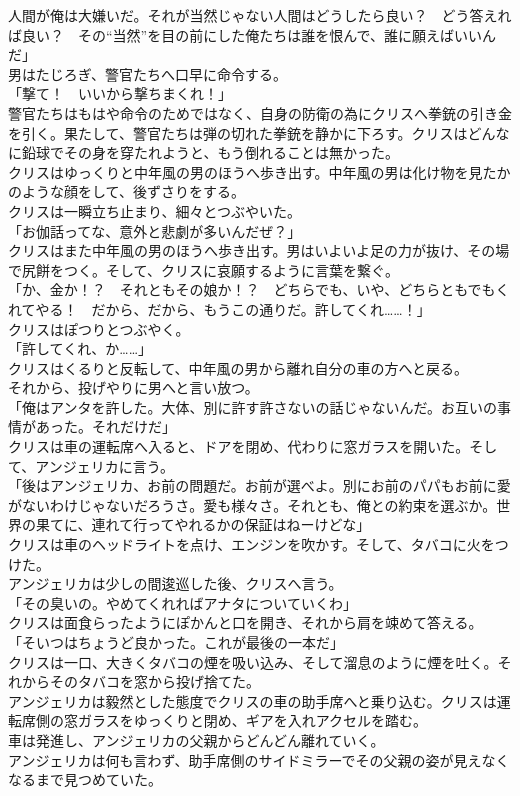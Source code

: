 \documentclass[b5j,10pt,openany]{jsbook}
\begin{document}
人間が俺は大嫌いだ。それが当然じゃない人間はどうしたら良い？　どう答えれば良い？　その``当然''を目の前にした俺たちは誰を恨んで、誰に願えばいいんだ」\\男はたじろぎ、警官たちへ口早に命令する。\\「撃て！　いいから撃ちまくれ！」\\警官たちはもはや命令のためではなく、自身の防衛の為にクリスへ拳銃の引き金を引く。果たして、警官たちは弾の切れた拳銃を静かに下ろす。クリスはどんなに鉛球でその身を穿たれようと、もう倒れることは無かった。\\クリスはゆっくりと中年風の男のほうへ歩き出す。中年風の男は化け物を見たかのような顔をして、後ずさりをする。\\クリスは一瞬立ち止まり、細々とつぶやいた。\\「お伽話ってな、意外と悲劇が多いんだぜ？」\\クリスはまた中年風の男のほうへ歩き出す。男はいよいよ足の力が抜け、その場で尻餅をつく。そして、クリスに哀願するように言葉を繋ぐ。\\「か、金か！？　それともその娘か！？　どちらでも、いや、どちらともでもくれてやる！　だから、だから、もうこの通りだ。許してくれ\ldots{}\ldots{}！」\\クリスはぽつりとつぶやく。\\「許してくれ、か\ldots{}\ldots{}」\\クリスはくるりと反転して、中年風の男から離れ自分の車の方へと戻る。\\それから、投げやりに男へと言い放つ。\\「俺はアンタを許した。大体、別に許す許さないの話じゃないんだ。お互いの事情があった。それだけだ」\\クリスは車の運転席へ入ると、ドアを閉め、代わりに窓ガラスを開いた。そして、アンジェリカに言う。\\「後はアンジェリカ、お前の問題だ。お前が選べよ。別にお前のパパもお前に愛がないわけじゃないだろうさ。愛も様々さ。それとも、俺との約束を選ぶか。世界の果てに、連れて行ってやれるかの保証はねーけどな」\\クリスは車のヘッドライトを点け、エンジンを吹かす。そして、タバコに火をつけた。\\アンジェリカは少しの間逡巡した後、クリスへ言う。\\「その臭いの。やめてくれればアナタについていくわ」\\クリスは面食らったようにぽかんと口を開き、それから肩を竦めて答える。\\「そいつはちょうど良かった。これが最後の一本だ」\\クリスは一口、大きくタバコの煙を吸い込み、そして溜息のように煙を吐く。それからそのタバコを窓から投げ捨てた。\\アンジェリカは毅然とした態度でクリスの車の助手席へと乗り込む。クリスは運転席側の窓ガラスをゆっくりと閉め、ギアを入れアクセルを踏む。\\車は発進し、アンジェリカの父親からどんどん離れていく。\\アンジェリカは何も言わず、助手席側のサイドミラーでその父親の姿が見えなくなるまで見つめていた。
\end{document}
